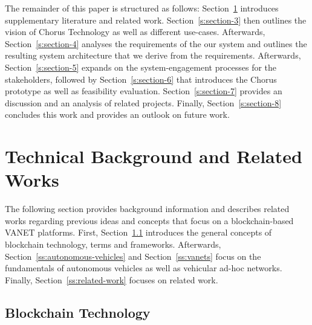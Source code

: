 \documentclass{llncs}
\begin{document}
{		The remainder of this paper is structured as follows: Section~\ref{s:section-2} introduces supplementary literature and related work. Section~\ref{s:section-3} then outlines the vision of Chorus Technology as well as different use-cases. Afterwards, Section~\ref{s:section-4} analyses the requirements of the our system and outlines the resulting system architecture that we derive from the requirements. Afterwards, Section~\ref{s:section-5} expands on the system-engagement processes for the stakeholders, followed by Section~\ref{s:section-6} that introduces the Chorus prototype as well as feasibility evaluation. Section~\ref{s:section-7} provides an discussion and an analysis of related projects. Finally, Section~\ref{s:section-8} concludes this work and provides an outlook on future work.



	\section{Technical Background and Related Works}	
		\label{s:section-2}
		
		The following section provides background information and describes related works regarding previous ideas and concepts that focus on a blockchain-based VANET platforms. First, Section~\ref{ss:blockchain-intro} introduces the general concepts of blockchain technology, terms and frameworks. Afterwards, Section~\ref{ss:autonomous-vehicles} and Section~\ref{ss:vanets} focus on the fundamentals of autonomous vehicles as well as vehicular ad-hoc networks. Finally, Section~\ref{ss:related-work} focuses on related work.	
					
		
		\subsection{Blockchain Technology}
			\label{ss:blockchain-intro}
			


}
\end{document}
